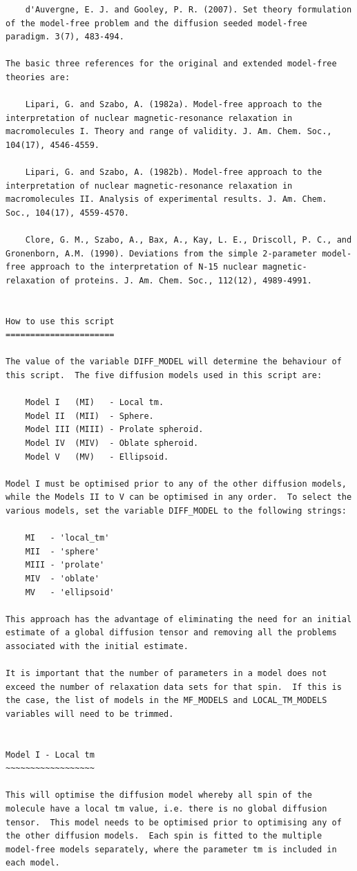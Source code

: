 \begin{lstlisting}
    d'Auvergne, E. J. and Gooley, P. R. (2007). Set theory formulation of the model-free problem and the diffusion seeded model-free paradigm. 3(7), 483-494.

The basic three references for the original and extended model-free theories are:

    Lipari, G. and Szabo, A. (1982a). Model-free approach to the interpretation of nuclear magnetic-resonance relaxation in macromolecules I. Theory and range of validity. J. Am. Chem. Soc., 104(17), 4546-4559.

    Lipari, G. and Szabo, A. (1982b). Model-free approach to the interpretation of nuclear magnetic-resonance relaxation in macromolecules II. Analysis of experimental results. J. Am. Chem. Soc., 104(17), 4559-4570.

    Clore, G. M., Szabo, A., Bax, A., Kay, L. E., Driscoll, P. C., and Gronenborn, A.M. (1990). Deviations from the simple 2-parameter model-free approach to the interpretation of N-15 nuclear magnetic-relaxation of proteins. J. Am. Chem. Soc., 112(12), 4989-4991.


How to use this script
======================

The value of the variable DIFF_MODEL will determine the behaviour of this script.  The five diffusion models used in this script are:

    Model I   (MI)   - Local tm.
    Model II  (MII)  - Sphere.
    Model III (MIII) - Prolate spheroid.
    Model IV  (MIV)  - Oblate spheroid.
    Model V   (MV)   - Ellipsoid.

Model I must be optimised prior to any of the other diffusion models, while the Models II to V can be optimised in any order.  To select the various models, set the variable DIFF_MODEL to the following strings:

    MI   - 'local_tm'
    MII  - 'sphere'
    MIII - 'prolate'
    MIV  - 'oblate'
    MV   - 'ellipsoid'

This approach has the advantage of eliminating the need for an initial estimate of a global diffusion tensor and removing all the problems associated with the initial estimate.

It is important that the number of parameters in a model does not exceed the number of relaxation data sets for that spin.  If this is the case, the list of models in the MF_MODELS and LOCAL_TM_MODELS variables will need to be trimmed.


Model I - Local tm
~~~~~~~~~~~~~~~~~~

This will optimise the diffusion model whereby all spin of the molecule have a local tm value, i.e. there is no global diffusion tensor.  This model needs to be optimised prior to optimising any of the other diffusion models.  Each spin is fitted to the multiple model-free models separately, where the parameter tm is included in each model.


\end{lstlisting}
